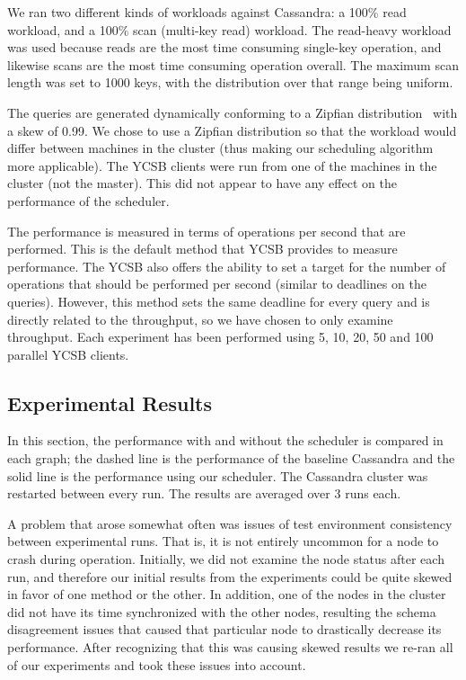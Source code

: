 We ran two different kinds of workloads against Cassandra: a 100\% read workload, and a 100\% scan (multi-key read) workload. The read-heavy workload was used because reads are the most time consuming single-key operation, and likewise scans are the most time consuming operation overall. The maximum scan length was set to 1000 keys, with the distribution over that range being uniform.

The queries are generated dynamically conforming to a Zipfian distribution~\cite{Gray:1994:QGB:191843.191886} with a skew of 0.99. We chose to use a Zipfian distribution so that the workload would differ between machines in the cluster (thus making our scheduling algorithm more applicable). The YCSB clients were run from one of the machines in the cluster (not the master). This did not appear to have any effect on the performance of the scheduler. 

The performance is measured in terms of operations per second that are performed. This is the default method that YCSB provides to measure performance. The YCSB also offers the ability to set a target for the number of operations that should be performed per second (similar to deadlines on the queries). However, this method sets the same deadline for every query and is directly related to the throughput, so we have chosen to only examine throughput. Each experiment has been performed using 5, 10, 20, 50 and 100 parallel YCSB clients.

\subsection{Experimental Results}
In this section, the performance with and without the scheduler is compared in each graph; the dashed line is the performance of the baseline Cassandra and the solid line is the performance using our scheduler. The Cassandra cluster was restarted between every run. The results are averaged over 3 runs each.

A problem that arose somewhat often was issues of test environment consistency between experimental runs. That is, it is not entirely uncommon for a node to crash during operation. Initially, we did not examine the node status after each run, and therefore our initial results from the experiments could be quite skewed in favor of one method or the other. In addition, one of the nodes in the cluster did not have its time synchronized with the other nodes, resulting the schema disagreement issues that caused that particular node to drastically decrease its performance. After recognizing that this was causing skewed results we re-ran all of our experiments and took these issues into account.

